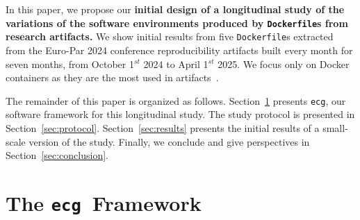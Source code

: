 \documentclass[sigconf,natbib=false]{acmart}
\newcommand{\df}{\texttt{Dockerfile}}
\newcommand{\ecg}{\texttt{ecg}}
\newcommand{\todo}[1]{{\color{red}{TODO: #1}}}
\begin{document}


In this paper, we propose our \textbf{initial design of a longitudinal study of the variations of the software environments produced by \df s from research artifacts.}
We show initial results from five \df s extracted from the Euro-Par 2024 conference reproducibility artifacts built every month for seven months, from October 1$^{st}$ 2024 to April 1$^{st}$ 2025.
We focus only on Docker containers as they are the most used in artifacts~\cite{guilloteau2024longevity}.

% 

The remainder of this paper is organized as follows.
Section~\ref{sec:ecg} presents \ecg, our software framework for this longitudinal study.
The study protocol is presented in Section~\ref{sec:protocol}.
Section~\ref{sec:results} presents the initial results of a small-scale version of the study.
Finally, we conclude and give perspectives in Section~\ref{sec:conclusion}.

\section{The \ecg\ Framework}\label{sec:ecg}

\end{document}
